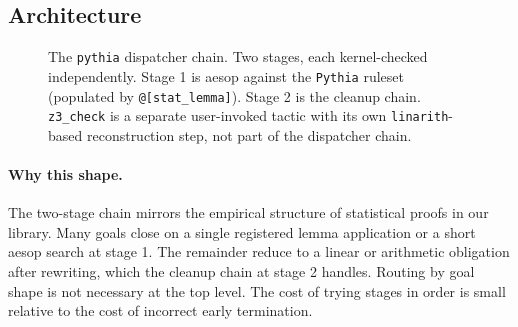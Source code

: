 \subsection{Architecture}
\label{sec:tactic-surface-arch}

\begin{figure}[h]
\centering

\caption{The \texttt{pythia} dispatcher chain. Two stages, each
kernel-checked independently. Stage 1 is aesop against the
\texttt{Pythia} ruleset (populated by \texttt{@[stat\_lemma]}).
Stage 2 is the cleanup chain. \texttt{z3\_check} is a separate
user-invoked tactic with its own \texttt{linarith}-based
reconstruction step, not part of the dispatcher chain.}
\label{fig:arch}
\end{figure}

\paragraph{Why this shape.}
The two-stage chain mirrors the empirical structure of statistical
proofs in our library. Many goals close on a single registered
lemma application or a short aesop search at stage 1. The remainder
reduce to a linear or arithmetic obligation after rewriting, which
the cleanup chain at stage 2 handles. Routing by goal shape is not
necessary at the top level. The cost of trying stages in order is
small relative to the cost of incorrect early termination.
